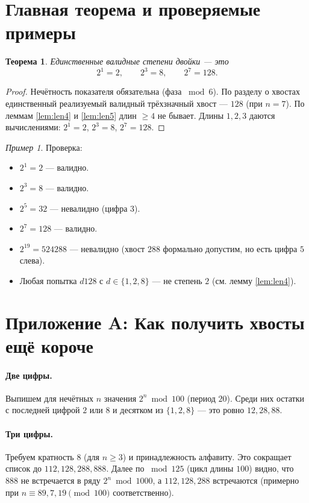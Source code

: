 \documentclass[12pt]{article}
\theoremstyle{plain}
\newtheorem{theorem}{Теорема}
\theoremstyle{remark}
\newtheorem*{example}{Пример}
\begin{document}
\section{Главная теорема и проверяемые примеры}
\begin{theorem}
Единственные валидные степени двойки — это
\[
2^1=2,\qquad 2^3=8,\qquad 2^7=128.
\]
\end{theorem}

\begin{proof}
Нечётность показателя обязательна (фаза $\bmod 6$). По разделу о хвостах единственный реализуемый валидный трёхзначный хвост — $128$ (при $n=7$). По леммам \ref{lem:len4} и \ref{lem:len5} длин $\ge4$ не бывает. Длины $1,2,3$ даются вычислениями: $2^1=2$, $2^3=8$, $2^7=128$.
\end{proof}

\begin{example}
Проверка:
\begin{itemize}[nosep]
\item $2^1=2$ — валидно.
\item $2^3=8$ — валидно.
\item $2^5=32$ — невалидно (цифра $3$).
\item $2^7=128$ — валидно.
\item $2^{19}=524288$ — невалидно (хвост $288$ формально допустим, но есть цифра $5$ слева).
\item Любая попытка $d128$ с $d\in\{1,2,8\}$ — не степень $2$ (см. лемму \ref{lem:len4}).
\end{itemize}
\end{example}

\section*{Приложение A: Как получить хвосты ещё короче}
\paragraph{Две цифры.} Выпишем для нечётных $n$ значения $2^n\bmod100$ (период $20$). Среди них остатки с последней цифрой $2$ или $8$ и десятком из $\{1,2,8\}$ — это ровно $12,28,88$.

\paragraph{Три цифры.} Требуем кратность $8$ (для $n\ge3$) и принадлежность алфавиту. Это сокращает список до $112,128,288,888$. Далее по $\bmod125$ (цикл длины $100$) видно, что $888$ не встречается в ряду $2^n\bmod1000$, а $112,128,288$ встречаются (примерно при $n\equiv 89,7,19\pmod{100}$ соответственно).
\end{document}

